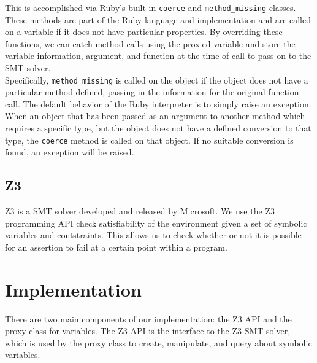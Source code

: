 \documentclass[10pt]{article}
\begin{document}
This is accomplished via Ruby's built-in \texttt{coerce} and \texttt{method\_missing} classes.  These methods are part of the Ruby language and implementation and are called on a variable if it does not have particular properties.  By overriding these functions, we can catch method calls using the proxied variable and store the variable information, argument, and function at the time of call to pass on to the SMT solver.\\

Specifically, \texttt{method\_missing} is called on the object if the object does not have a particular method defined, passing in the information for the original function call.  The default behavior of the Ruby interpreter is to simply raise an exception.\\

When an object that has been passed as an argument to another method which requires a specific type, but the object does not have a defined conversion to that type, the \texttt{coerce} method is called on that object.  If no suitable conversion is found, an exception will be raised.\\

\subsection{Z3}
Z3 is a SMT solver developed and released by Microsoft.  We use the Z3 programming API check satisfiability of the environment given a set of symbolic variables and contstraints.  This allows us to check whether or not it is possible for an assertion to fail at a certain point within a program.\\

\section{Implementation}
There are two main components of our implementation: the Z3 API and the proxy class for variables.  The Z3 API is the interface to the Z3 SMT solver, which is used by the proxy class to create, manipulate, and query about symbolic variables.\\
\end{document}

